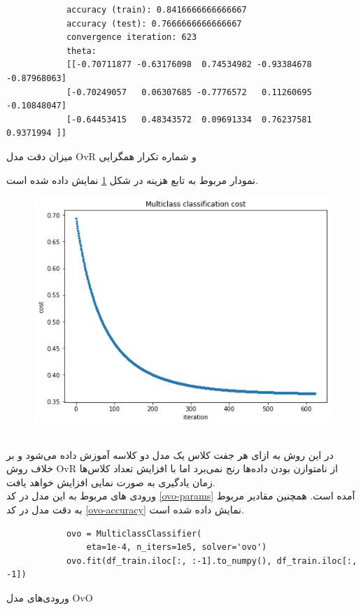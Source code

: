 \documentclass[]{article}
\begin{document}
\begin{code}[h]
	\begin{latin}
		\begin{verbatim}
			accuracy (train): 0.8416666666666667
			accuracy (test): 0.7666666666666667
			convergence iteration: 623
			theta: 
			[[-0.70711877 -0.63176098  0.74534982 -0.93384678 -0.87968063]
			[-0.70249057   0.06307685 -0.7776572   0.11260695 -0.10848047]
			[-0.64453415   0.48343572  0.09691334  0.76237581  0.9371994 ]]
		\end{verbatim}
	\end{latin}
	\caption{میزان دقت مدل OvR و شماره تکرار همگرایی}
	\label{ovr-accuracy}
\end{code}

نمودار مربوط به تابع هزینه در شکل \ref{fig:multi-logistic-costs} نمایش داده شده است.

\begin{figure}
	\centering
	\includegraphics[width=0.8\linewidth]{multi-logistic-costs-small}
	\caption{}
	\label{fig:multi-logistic-costs}
\end{figure}


\newpage

\subsection{}
در این روش به ازای هر جفت کلاس یک مدل دو کلاسه آموزش داده می‌شود و بر خلاف روش OvR از نامتوازن بودن داده‌ها رنج نمی‌برد اما با افزایش تعداد کلاس‌ها زمان یادگیری به صورت نمایی افزایش خواهد یافت.\\
ورودی های مربوط به این مدل در کد \ref{ovo-params} آمده است. همچنین مقادیر مربوط به دقت مدل در کد \ref{ovo-accuracy} نمایش داده شده است.


\begin{code}[h]
	\begin{latin}
		\begin{verbatim}
			ovo = MulticlassClassifier(
				eta=1e-4, n_iters=1e5, solver='ovo')
			ovo.fit(df_train.iloc[:, :-1].to_numpy(), df_train.iloc[:, -1])
		\end{verbatim}
	\end{latin}
	\caption{ورودی‌های مدل OvO}
	\label{ovo-params}
\end{code}
\end{document}
